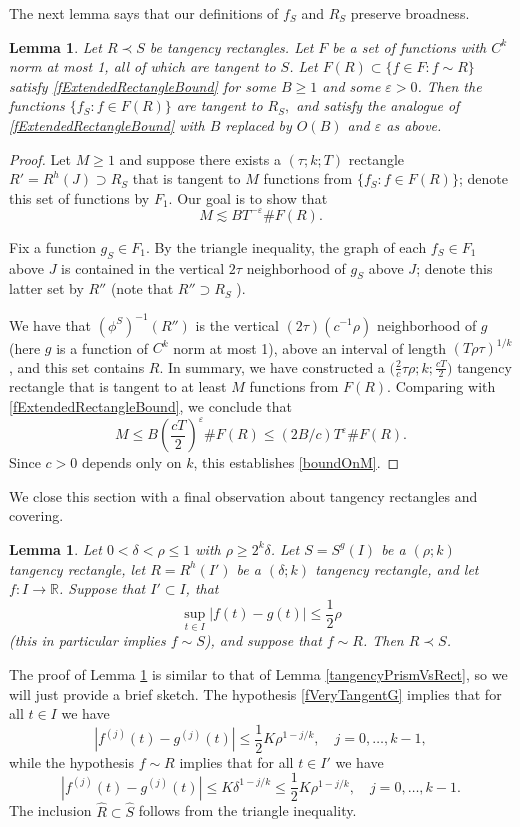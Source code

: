 \documentclass[letterpaper, reqno,11pt]{article}
\numberwithin{equation}{section}
\newcommand{\RR}{\mathbb{R}}
\newcommand{\eps}{\varepsilon}
\numberwithin{thm}{section}
\newtheorem{lem}[thm]{Lemma}
\theoremstyle{remark}
\begin{document}
The next lemma says that our definitions of $f_S$ and $R_S$ preserve broadness. 
\begin{lem}
Let $R\prec S$ be tangency rectangles. Let $F$ be a set of functions with $C^k$ norm at most 1, all of which are tangent to $S$. Let $F(R)\subset\{f\in F\colon f\sim R\}$ satisfy \eqref{fExtendedRectangleBound} for some $B\geq 1$ and some $\eps>0$. Then the functions $\{f_S\colon f\in F(R)\}$ are tangent to $R_S,$ and satisfy the analogue of \eqref{fExtendedRectangleBound} with $B$ replaced by $O(B)$ and $\eps$ as above.
\end{lem}
\begin{proof}
Let $M\geq 1$ and suppose there exists a $(\tau;k;T)$ rectangle $R'=R^h(J) \supset R_S$ that is tangent to $M$ functions from $\{f_S \colon f\in F(R)\}$; denote this set of functions by $F_1$. Our goal is to show that
\begin{equation}\label{boundOnM}
M \lesssim B T^{-\eps}\#F(R).
\end{equation}

Fix a function $g_S\in F_1$. By the triangle inequality, the graph of each $f_S\in F_1$ above $J$ is contained in the vertical $2\tau$ neighborhood of $g_S$ above $J$; denote this latter set by $R''$ (note that $R''\supset R_S$ ). 

We have that $(\phi^S)^{-1}(R'')$ is the vertical $(2\tau)(c^{-1}\rho)$ neighborhood of $g$ (here $g$ is a function of $C^k$ norm at most 1), above an interval of length $(T\rho\tau)^{1/k}$, and this set contains $R$. In summary, we have constructed a $\big(\frac{2}{c}\tau\rho; k; \frac{cT}{2}\big)$ tangency rectangle that is tangent to at least $M$ functions from $F(R)$. Comparing with \eqref{fExtendedRectangleBound}, we conclude that
\[
M \leq B (\frac{cT}{2})^{\eps} \#F(R) \leq (2B/c) T^\eps\#F(R).
\]
Since $c>0$ depends only on $k$, this establishes \eqref{boundOnM}.
\end{proof}

We close this section with a final observation about tangency rectangles and covering.
\begin{lem}\label{tangencyImpliesCover}
Let $0<\delta<\rho\leq 1$ with $\rho\geq 2^k \delta$. Let $S=S^g(I)$ be a $(\rho;k)$ tangency rectangle, let $R=R^h(I')$ be a $(\delta;k)$ tangency rectangle, and let $f\colon I\to\RR$. Suppose that $I'\subset I$, that 
%
\begin{equation}\label{fVeryTangentG}
\sup_{t\in I}|f(t)-g(t)|\leq \frac{1}{2}\rho
\end{equation}
%
(this in particular implies $f\sim S$), and suppose that $f\sim R$. Then $R\prec S$.
\end{lem}
The proof of Lemma \ref{tangencyImpliesCover} is similar to that of Lemma \ref{tangencyPrismVsRect}, so we will just provide a brief sketch. The hypothesis \eqref{fVeryTangentG} implies that for all $t\in I$ we have
\[
|f^{(j)}(t)-g^{(j)}(t)|\leq \frac{1}{2} K \rho^{1-j/k},\quad j = 0,\ldots,k-1,
\]
while the hypothesis $f\sim R$ implies that for all $t\in I'$ we have
\[
|f^{(j)}(t)-g^{(j)}(t)|\leq  K \delta^{1-j/k}\leq \frac{1}{2}K\rho^{1-j/k},\quad j = 0,\ldots,k-1.
\]
The inclusion $\hat R \subset \hat S$ follows from the triangle inequality. 
\end{document}
